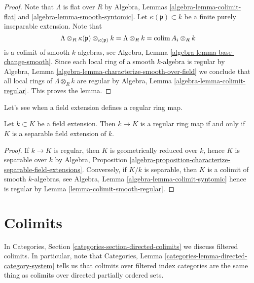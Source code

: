 \begin{proof}
Note that $\Lambda$ is flat over $R$ by
Algebra, Lemmas \ref{algebra-lemma-colimit-flat} and
\ref{algebra-lemma-smooth-syntomic}.
Let $\kappa(\mathfrak p) \subset k$ be a finite purely inseparable
extension. Note that
$$
\Lambda \otimes_R \kappa(\mathfrak p) \otimes_{\kappa(\mathfrak p)} k =
\Lambda \otimes_R k = \mathop{\rm colim}\nolimits A_i \otimes_R k
$$
is a colimit of smooth $k$-algebras, see
Algebra, Lemma \ref{algebra-lemma-base-change-smooth}.
Since each local ring of a smooth $k$-algebra is regular by
Algebra, Lemma \ref{algebra-lemma-characterize-smooth-over-field}
we conclude that all local rings of $\Lambda \otimes_R k$ are
regular by
Algebra, Lemma \ref{algebra-lemma-colimit-regular}.
This proves the lemma.
\end{proof}

\noindent
Let's see when a field extension defines a regular ring map.

\begin{lemma}
\label{lemma-regular-field-extension}
Let $k \subset K$ be a field extension. Then $k \to K$ is a regular
ring map if and only if $K$ is a separable field extension of $k$.
\end{lemma}

\begin{proof}
If $k \to K$ is regular, then $K$ is geometrically reduced over $k$,
hence $K$ is separable over $k$ by
Algebra, Proposition
\ref{algebra-proposition-characterize-separable-field-extensions}.
Conversely, if $K/k$ is separable, then $K$ is a colimit of smooth
$k$-algebras, see
Algebra, Lemma \ref{algebra-lemma-colimit-syntomic}
hence is regular by
Lemma \ref{lemma-colimit-smooth-regular}.
\end{proof}












\section{Colimits}
\label{section-colimits}

\noindent
In Categories, Section \ref{categories-section-directed-colimits}
we discuss filtered colimits. In particular, note that
Categories, Lemma \ref{categories-lemma-directed-category-system}
tells us that colimits over filtered index categories are the same
thing as colimits over directed partially ordered sets.

